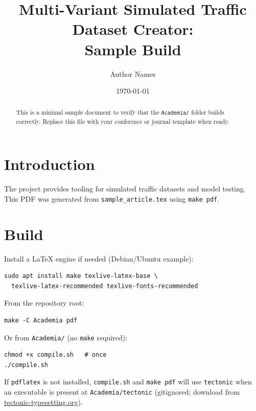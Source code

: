 \documentclass[11pt,a4paper]{article}
\title{Multi-Variant Simulated Traffic Dataset Creator:\\Sample Build}
\author{Author Names}
\date{\today}
\begin{document}
\maketitle

\begin{abstract}
This is a minimal sample document to verify that the \texttt{Academia/} folder
builds correctly. Replace this file with your conference or journal template
when ready.
\end{abstract}

\section{Introduction}
The project provides tooling for simulated traffic datasets and model testing.
This PDF was generated from \texttt{sample\_article.tex} using \texttt{make pdf}.

\section{Build}
Install a LaTeX engine if needed (Debian/Ubuntu example):
\begin{verbatim}
sudo apt install make texlive-latex-base \
  texlive-latex-recommended texlive-fonts-recommended
\end{verbatim}
From the repository root:
\begin{verbatim}
make -C Academia pdf
\end{verbatim}
Or from \texttt{Academia/} (no \texttt{make} required):
\begin{verbatim}
chmod +x compile.sh   # once
./compile.sh
\end{verbatim}
If \texttt{pdflatex} is not installed, \texttt{compile.sh} and \texttt{make pdf} will use
\texttt{tectonic} when an executable is present at \texttt{Academia/tectonic} (gitignored;
download from \href{https://tectonic-typesetting.org/}{tectonic-typesetting.org}).
\end{document}
